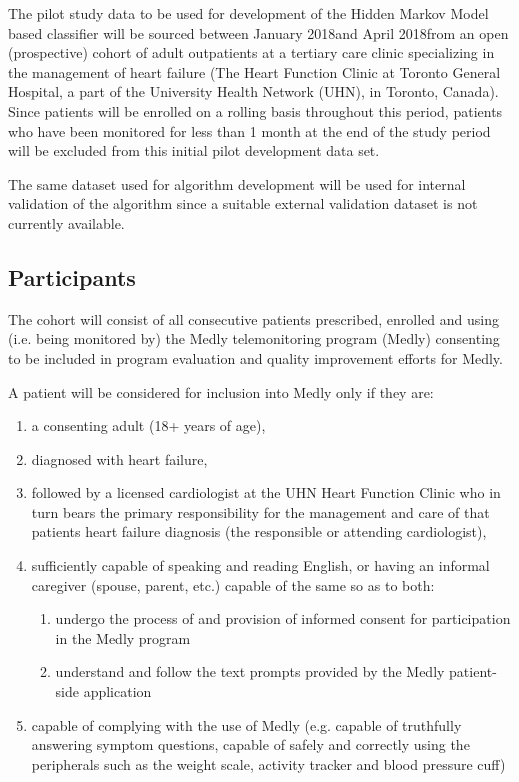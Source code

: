 \documentclass[]{article}
\newcommand{\STUDYSTARTDATE}{January 2018}
\newcommand{\STUDYENDDATE}{April 2018}
\begin{document}
The pilot study data to be used for development of the Hidden Markov Model based classifier will be sourced between \STUDYSTARTDATE\space and \STUDYENDDATE\space from an open (prospective) cohort of adult outpatients at a tertiary care clinic specializing in the management of heart failure (The Heart Function Clinic at Toronto General Hospital, a part of the University Health Network (UHN), in Toronto, Canada). Since patients will be enrolled on a rolling basis throughout this period, patients who have been monitored for less than 1 month at the end of the study period will be excluded from this initial pilot development data set.

The same dataset used for algorithm development will be used for internal validation of the algorithm since a suitable external validation dataset is not currently available.


\subsection{Participants} %

The cohort will consist of all consecutive patients prescribed, enrolled and using (i.e. being monitored by) the Medly telemonitoring program (Medly) consenting to be included in program evaluation and quality improvement efforts for Medly.

A patient will be considered for inclusion into Medly only if they are:
\begin{enumerate}
	\item a consenting adult (18+ years of age), 
	\item diagnosed with heart failure,
	\item followed by a licensed cardiologist at the UHN Heart Function Clinic who in turn bears the primary responsibility for the management and care of that patients heart failure diagnosis (the responsible or attending cardiologist),
	\item sufficiently capable of speaking and reading English, or having an informal caregiver (spouse, parent, etc.) capable of the same so as to both: 
	\begin{enumerate}
		\item undergo the process of and provision of informed consent for participation in the Medly program
		\item understand and follow the text prompts provided by the Medly patient-side application
	\end{enumerate}
	\item capable of complying with the use of Medly (e.g. capable of truthfully answering symptom questions, capable of safely and correctly using the peripherals such as the weight scale, activity tracker and blood pressure cuff)
\end{enumerate}
\end{document}
